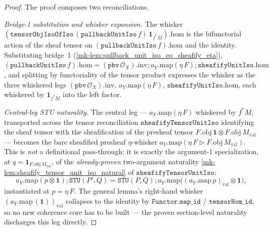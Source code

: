 \begin{proof}
  \leanok
  The proof composes two reconciliations.

  \emph{Bridge-1 substitution and whisker expansion.} The whisker
  \((\mathtt{tensorObjIsoOfIso}\,(\mathtt{pullbackUnitIso}\,f)\,\mathbf 1_{f^{*}M}).\mathrm{hom}\) is the
  bifunctorial action of the sheaf tensor on \((\mathtt{pullbackUnitIso}\,f).\mathrm{hom}\) and the
  identity. Substituting bridge~1 (\ref{mk-lem:pullback_unit_iso_eq_sheafify_eta}),
  \((\mathtt{pullbackUnitIso}\,f).\mathrm{hom} = (\mathtt{pbv}\,\mathcal{O}_X).\mathrm{inv}
  \mathbin{;} a_Y.\mathrm{map}(\eta\,F) \mathbin{;} \mathtt{sheafifyUnitIso}.\mathrm{hom}\), and
  splitting by functoriality of the tensor product expresses the whisker as the three whiskered legs
  \((\mathtt{pbv}\,\mathcal{O}_X).\mathrm{inv}\), \(a_Y.\mathrm{map}(\eta\,F)\),
  \(\mathtt{sheafifyUnitIso}.\mathrm{hom}\), each whiskered by \(\mathbf 1_{f^{*}M}\) into the left
  factor.

  \emph{Central-leg STU naturality.} The central leg --- \(a_Y.\mathrm{map}(\eta\,F)\) whiskered by
  \(f^{*}M\), transported across the tensor reconciliation \(\mathtt{sheafifyTensorUnitIso}\)
  identifying the sheaf tensor with the sheafification of the presheaf tensor
  \(F.\mathrm{obj}\,\mathbf 1 \otimes F.\mathrm{obj}\,M_{\mathrm{val}}\) --- becomes the bare sheafified
  presheaf \(\eta\)-whisker \(a_Y.\mathrm{map}(\eta\,F \rhd F.\mathrm{obj}\,M_{\mathrm{val}})\). This is
  \emph{not} a definitional pass-through: it is exactly the argument-1 specialization, at
  \(q = \mathbf 1_{F.\mathrm{obj}\,M_{\mathrm{val}}}\), of the \emph{already-proven} two-argument
  naturality \ref{mk-lem:sheafify_tensor_unit_iso_natural} of \(\mathtt{sheafifyTensorUnitIso}\):
  \[
    a_Y.\mathrm{map}(p \otimes \mathbf 1) \mathbin{;} \mathtt{STU}(P',Q)
      = \mathtt{STU}(P,Q) \mathbin{;} a_Y.\mathrm{map}\bigl((a_Y.\mathrm{map}\,p)_{\mathrm{val}} \otimes \mathbf 1\bigr),
  \]
  instantiated at \(p = \eta\,F\). The general lemma's right-hand whisker
  \((a_Y.\mathrm{map}\,(\mathbf 1))_{\mathrm{val}}\) collapses to the identity by
  \(\mathtt{Functor.map\_id}\) / \(\mathtt{tensorHom\_id}\), so no new coherence core has to be built ---
  the proven section-level naturality discharges this leg directly.


\end{proof}
